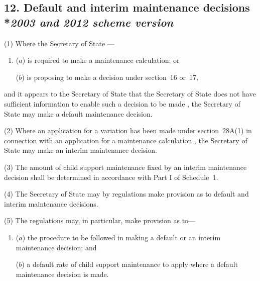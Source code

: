 \documentclass[12pt,a4paper]{article}
\begin{document}
\subsection[12. Default and interim maintenance decisions --- \emph{2003 and 2012 scheme version}]{12. Default and interim maintenance decisions\\*\emph{2003 and 2012 scheme version}}

(1) Where the 
Secretary of State%
—
\begin{enumerate}\item[]
($a$) is required to make a maintenance calculation; or

($b$) is proposing to make a decision under section~16 or~17,
\end{enumerate}
and it appears to 
the 
Secretary of State  %
that 
the Secretary of State  %
does not have sufficient information to enable 
such a decision to be made%
, 
the Secretary of State  %
may make a default maintenance decision.

(2) Where an application for a variation has been made under section~28A(1)  in connection with an application for a maintenance calculation%
, the 
Secretary of State  %
may make an interim maintenance decision.

(3) The amount of child support maintenance fixed by an interim maintenance decision shall be determined in accordance with Part I of Schedule~1. 

(4) The Secretary of State may by regulations make provision as to default and interim maintenance decisions.

(5) The regulations may, in particular, make provision as to—
\begin{enumerate}\item[]
($a$) the procedure to be followed in making a default or an interim maintenance decision; and

($b$) a default rate of child support maintenance to apply where a default maintenance decision is made.
\end{enumerate}
\end{document}
